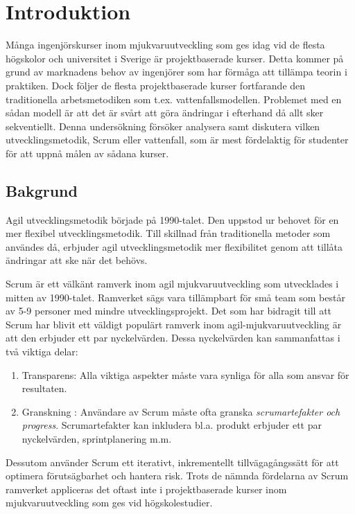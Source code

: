 \section{Introduktion}
\label{sec:Lieth_Wahid-introduction}
Många ingenjörskurser inom mjukvaruutveckling som ges idag vid de flesta högskolor och universitet i Sverige är projektbaserade kurser. Detta kommer på grund av marknadens behov av ingenjörer som har förmåga att tillämpa teorin i praktiken. Dock följer de flesta projektbaserade kurser fortfarande den traditionella arbetsmetodiken som t.ex. vattenfallsmodellen. Problemet med en sådan modell är att det är svårt att göra ändringar i efterhand då allt sker sekventiellt. Denna undersökning försöker analysera samt diskutera vilken utvecklingsmetodik, Scrum eller vattenfall, som är mest fördelaktig för studenter för att uppnå målen av sådana kurser.

\subsection{Bakgrund}
Agil utvecklingsmetodik började på 1990-talet. Den uppstod ur behovet för en mer flexibel utvecklingsmetodik. Till skillnad från traditionella metoder som användes då, erbjuder agil utvecklingsmetodik mer flexibilitet genom att tillåta ändringar att ske när det behövs.

Scrum är ett välkänt ramverk inom agil mjukvaruutveckling som utvecklades i mitten av 1990-talet.\cite{TheScrum} 
Ramverket sägs vara tillämpbart för små team som består av 5-9 personer med mindre utvecklingsprojekt. Det som har bidragit till att Scrum har blivit ett väldigt populärt ramverk inom agil-mjukvaruutveckling är att den erbjuder ett par nyckelvärden. Dessa nyckelvärden kan sammanfattas i två viktiga delar: 
\begin{enumerate}\label{two}
	\item Transparens: Alla viktiga aspekter måste vara synliga för alla som ansvar för resultaten.\cite{TheScrum}
	\item Granskning : Användare av Scrum måste ofta granska \textit{scrumartefakter och progress}. Scrumartefakter kan inkludera
	bl.a. produkt erbjuder ett par nyckelvärden, sprintplanering m.m.\cite{TheScrum}
\end{enumerate} 
Dessutom använder Scrum ett iterativt, inkrementellt tillvägagångssätt för att optimera förutsägbarhet och hantera risk.\cite{TheScrum} Trots de nämnda fördelarna av Scrum ramverket appliceras det oftast inte i projektbaserade kurser inom mjukvaruutveckling som ges vid högskolestudier. 

